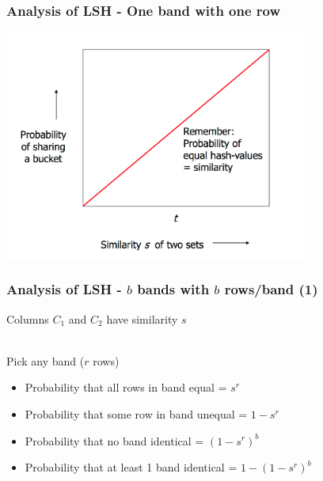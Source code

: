 \documentclass[svgnames]{beamer}
\begin{document}
  
\begin{frame} \frametitle{Analysis of LSH - One band with one row}
\includegraphics[width=10cm]{what-1-band-gives}
\end{frame}

  
\begin{frame} \frametitle{Analysis of LSH - $b$ bands with $b$ rows/band (1)}

Columns $C_1$ and $C_2$ have similarity $s$

~\\

Pick any band ($r$ rows)

\begin{itemize}
  \item Probability that all rows in band equal = $s^r$
  \item Probability that some row in band unequal = $1 - s^r$
  \item Probability that no band identical = $(1 - s^r)^b$
  \item Probability that at least 1 band identical = $1 - (1 - s^r)^b$  
\end{itemize}
\end{frame}

  
\end{document}

